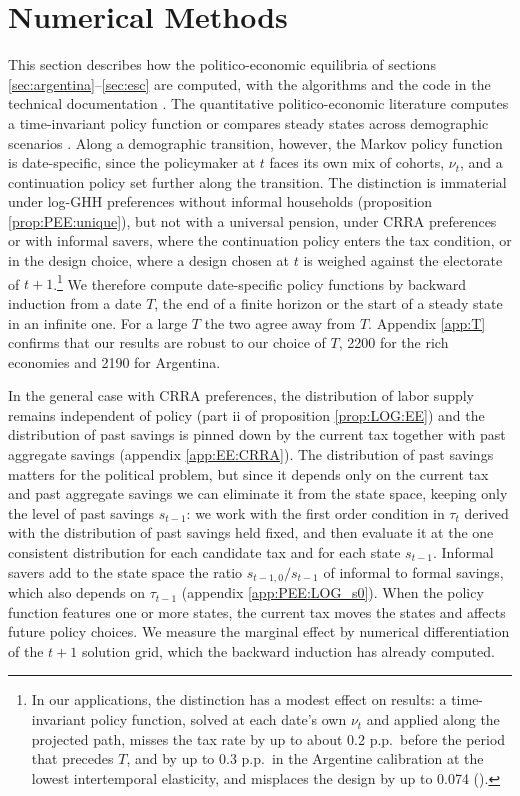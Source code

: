 \section{Numerical Methods}\label{sec:numerical}

This section describes how the politico-economic equilibria of sections \ref{sec:argentina}--\ref{sec:esc} are computed, with the algorithms and the code in the technical documentation \parencite{BergGE26doc}. The quantitative politico-economic literature computes a time-invariant policy function \parencite{KrusellRR99a1,Forni05a1,Song12a1} or compares steady states across demographic scenarios \parencite{Galasso99a1}. Along a demographic transition, however, the Markov policy function is date-specific, since the policymaker at $t$ faces its own mix of cohorts, $\nu_t$, and a continuation policy set further along the transition. The distinction is immaterial under log-GHH preferences without informal households (proposition \ref{prop:PEE:unique}), but not with a universal pension, under CRRA preferences or with informal savers, where the continuation policy enters the tax condition, or in the design choice, where a design chosen at $t$ is weighed against the electorate of $t+1$.\footnote{In our applications, the distinction has a modest effect on results: a time-invariant policy function, solved at each date's own $\nu_t$ and applied along the projected path, misses the tax rate by up to about 0.2 p.p.\ before the period that precedes $T$, and by up to 0.3 p.p.\ in the Argentine calibration at the lowest intertemporal elasticity, and misplaces the design by up to 0.074 ().} We therefore compute date-specific policy functions by backward induction from a date $T$, the end of a finite horizon or the start of a steady state in an infinite one. For a large $T$ the two agree away from $T$. Appendix \ref{app:T} confirms that our results are robust to our choice of $T$, 2200 for the rich economies and 2190 for Argentina.

In the general case with CRRA preferences, the distribution of labor supply remains independent of policy (part ii of proposition \ref{prop:LOG:EE}) and the distribution of past savings is pinned down by the current tax together with past aggregate savings (appendix \ref{app:EE:CRRA}). The distribution of past savings matters for the political problem, but since it depends only on the current tax and past aggregate savings we can eliminate it from the state space, keeping only the level of past savings $s_{t-1}$: we work with the first order condition in $\tau_t$ derived with the distribution of past savings held fixed, and then evaluate it at the one consistent distribution for each candidate tax and for each state $s_{t-1}$. Informal savers add to the state space the ratio $s_{t-1,0}/s_{t-1}$ of informal to formal savings, which also depends on $\tau_{t-1}$ (appendix \ref{app:PEE:LOG_s0}). When the policy function features one or more states, the current tax moves the states and affects future policy choices. We measure the marginal effect by numerical differentiation of the $t+1$ solution grid, which the backward induction has already computed.


